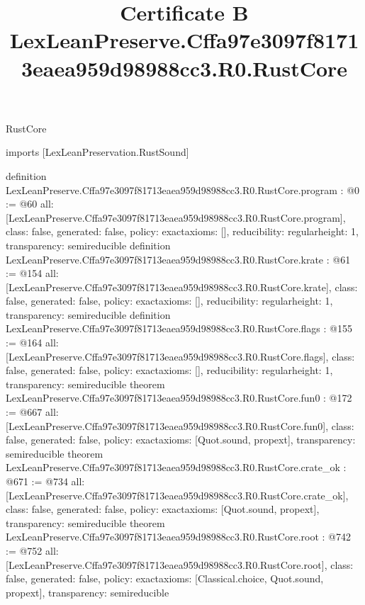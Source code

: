 \begin{lexlean}{RustCore}
\title{Certificate B LexLeanPreserve.Cffa97e3097f81713eaea959d98988cc3.R0.RustCore}
\begin{coremodule}
imports [LexLeanPreservation.RustSound]

definition LexLeanPreserve.Cffa97e3097f81713eaea959d98988cc3.R0.RustCore.program : @0 := @60 {
  all: [LexLeanPreserve.Cffa97e3097f81713eaea959d98988cc3.R0.RustCore.program],
  class: false,
  generated: false,
  policy: exact{axioms: []},
  reducibility: regular{height: 1},
  transparency: semireducible
}
definition LexLeanPreserve.Cffa97e3097f81713eaea959d98988cc3.R0.RustCore.krate : @61 := @154 {
  all: [LexLeanPreserve.Cffa97e3097f81713eaea959d98988cc3.R0.RustCore.krate],
  class: false,
  generated: false,
  policy: exact{axioms: []},
  reducibility: regular{height: 1},
  transparency: semireducible
}
definition LexLeanPreserve.Cffa97e3097f81713eaea959d98988cc3.R0.RustCore.flags : @155 := @164 {
  all: [LexLeanPreserve.Cffa97e3097f81713eaea959d98988cc3.R0.RustCore.flags],
  class: false,
  generated: false,
  policy: exact{axioms: []},
  reducibility: regular{height: 1},
  transparency: semireducible
}
theorem LexLeanPreserve.Cffa97e3097f81713eaea959d98988cc3.R0.RustCore.fun0 : @172 := @667 {
  all: [LexLeanPreserve.Cffa97e3097f81713eaea959d98988cc3.R0.RustCore.fun0],
  class: false,
  generated: false,
  policy: exact{axioms: [Quot.sound, propext]},
  transparency: semireducible
}
theorem LexLeanPreserve.Cffa97e3097f81713eaea959d98988cc3.R0.RustCore.crate_ok : @671 := @734 {
  all: [LexLeanPreserve.Cffa97e3097f81713eaea959d98988cc3.R0.RustCore.crate_ok],
  class: false,
  generated: false,
  policy: exact{axioms: [Quot.sound, propext]},
  transparency: semireducible
}
theorem LexLeanPreserve.Cffa97e3097f81713eaea959d98988cc3.R0.RustCore.root : @742 := @752 {
  all: [LexLeanPreserve.Cffa97e3097f81713eaea959d98988cc3.R0.RustCore.root],
  class: false,
  generated: false,
  policy: exact{axioms: [Classical.choice, Quot.sound, propext]},
  transparency: semireducible
}


\end{coremodule}
\end{lexlean}
